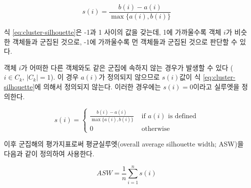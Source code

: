 \documentclass[]{book}
\begin{document}
\begin{equation}
s(i) = \frac{b(i) - a(i)}{\max \{ a(i), b(i) \}} \label{eq:cluster-silhouette}
\end{equation}

식 \eqref{eq:cluster-silhouette}은 -1과 1 사이의 값을 갖는데, 1에 가까울수록 객체 \(i\)가 비슷한 객체들과 군집된 것으로, -1에 가까울수록 먼 객체들과 군집된 것으로 판단할 수 있다.

객체 \(i\)가 어떠한 다른 객체와도 같은 군집에 속하지 않는 경우가 발생할 수 있다 (\(i \in C_k, \, \left| C_k \right| = 1\)). 이 경우 \(a(i)\)가 정의되지 않으므로 \(s(i)\)값이 식 \eqref{eq:cluster-silhouette}에 의해서 정의되지 않는다. 이러한 경우에는 \(s(i) = 0\)이라고 실루엣을 정의한다.

\begin{equation}
s(i) = \begin{cases}
\frac{b(i) - a(i)}{\max \{ a(i), b(i) \}} & \text{ if $a(i)$ is defined}\\
0 & \text{ otherwise }
\end{cases}
\label{eq:cluster-silhouette-single}
\end{equation}

이후 군집해의 평가지표로써 평균실루엣(overall average silhouette width; ASW)을 다음과 같이 정의하여 사용한다.

\begin{equation}
ASW = \frac{1}{n} \sum_{i = 1}^{n} s(i) \label{eq:cluster-average-silhouette}
\end{equation}
\end{document}
